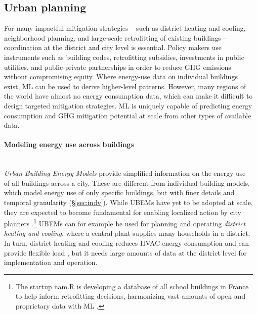 \documentclass[11pt]{report}
\begin{document}
\subsection{Urban planning}\label{sec:distr}
For many impactful mitigation strategies -- such as district heating and cooling, neighborhood planning, and large-scale retrofitting of existing buildings -- coordination at the district and city level is essential. Policy makers use instruments such as building codes, retrofitting subsidies, investments in public utilities, and public-private partnerships in order to reduce GHG emissions without compromising equity.  
Where energy-use data on individual buildings exist, ML can be used to derive higher-level patterns. However, many regions of the world have almost no energy consumption data, which can make it difficult to design targeted mitigation strategies. ML is uniquely capable of predicting energy consumption and GHG mitigation potential at scale from other types of available data. 

\paragraph{Modeling energy use across buildings}\label{sec:bldg3d}\mbox{}\\
\emph{Urban Building Energy Models} provide simplified information on the energy use of all buildings across a city. These are different from individual-building models, which model energy use of only specific buildings, but with finer details and temporal granularity (\S\ref{sec:indv}). While UBEMs have yet to be adopted at scale, they are expected to become fundamental for enabling localized action by city planners \cite{reinhart_urban_2016}.\footnote{The startup nam.R is developing a database of all school buildings in France to help inform retrofitting decisions, harmonizing vast amounts of open and proprietary data with ML \cite{namr}.}  UBEMs can for example be used for planning and operating \emph{district heating and cooling}, where a central plant supplies many households in a district. In turn, district heating and cooling reduces HVAC energy consumption and can provide flexible load \cite{VANDERMEULEN2018103}, but it needs large amounts of data at the district level for implementation and operation. 
\end{document}
